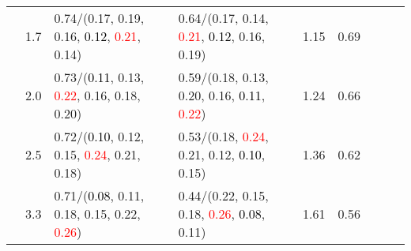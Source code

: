 \documentclass[10pt,a4paper]{report}
\begin{document}
\begin{table}[!htbp]
\begin{center}
{\begin{tabular}{ccllccccc}
				  & 1.7                               & 0.74/(0.17, 0.19, 0.16, \textcolor{black}{0.12}, \textcolor{red}{0.21}, 0.14)                                                                   & 0.64/(0.17, 0.14, \textcolor{red}{0.21}, \textcolor{black}{0.12}, 0.16, 0.19)                                                                   & 1.15             & 0.69                     \\
				  & 2.0                               & 0.73/(\textcolor{black}{0.11}, 0.13, \textcolor{red}{0.22}, 0.16, 0.18, 0.20)                                                                   & 0.59/(0.18, 0.13, 0.20, 0.16, \textcolor{black}{0.11}, \textcolor{red}{0.22})                                                                   & 1.24             & 0.66                     \\
				  & 2.5                               & 0.72/(\textcolor{black}{0.10}, 0.12, 0.15, \textcolor{red}{0.24}, 0.21, 0.18)                                                                   & 0.53/(0.18, \textcolor{red}{0.24}, 0.21, 0.12, \textcolor{black}{0.10}, 0.15)                                                                   & 1.36             & 0.62                     \\
				  & 3.3                               & 0.71/(\textcolor{black}{0.08}, 0.11, 0.18, 0.15, 0.22, \textcolor{red}{0.26})                                                                   & 0.44/(0.22, 0.15, 0.18, \textcolor{red}{0.26}, \textcolor{black}{0.08}, 0.11)                                                                   & 1.61             & 0.56                     \\
				\bottomrule
			\end{tabular}}
	\end{center}
\end{table}
\end{document}
